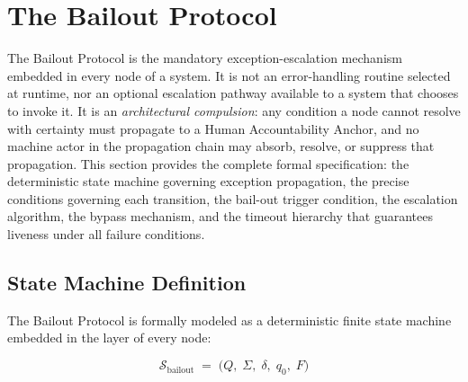 
\section{The Bailout Protocol}\label{sec:bailout}

The Bailout Protocol is the mandatory exception-escalation mechanism embedded in
every node of a \bxthree{} system. It is not an error-handling routine selected
at runtime, nor an optional escalation pathway available to a system that chooses
to invoke it. It is an \emph{architectural compulsion}: any condition a node
cannot resolve with certainty must propagate to a Human Accountability Anchor,
and no machine actor in the propagation chain may absorb, resolve, or suppress
that propagation. This section provides the complete formal specification:
the deterministic state machine governing exception propagation, the precise
conditions governing each transition, the bail-out trigger condition, the
escalation algorithm, the bypass mechanism, and the timeout hierarchy that
guarantees liveness under all failure conditions.


\subsection{State Machine Definition}\label{sec:bailout-state-machine}

The Bailout Protocol is formally modeled as a deterministic finite state machine
embedded in the \fact{} layer of every \bxthree{} node:

\[
\mathcal{S}_{\text{bailout}} \;=\; \bigl( Q,\; \Sigma,\; \delta,\; q_0,\; F \bigr)
\]

